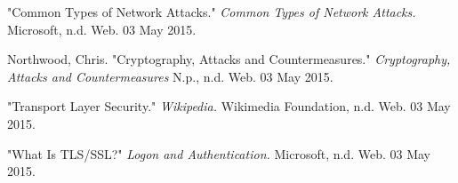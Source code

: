 \documentclass[a4paper,twoside,10pt]{report}
\begin{document}

\clearpage
{}
\begin{thebibliography}{9}
"Common Types of Network Attacks."
\textit{Common Types of Network Attacks. }
Microsoft, n.d. Web. 03 May 2015.
 
Northwood, Chris.
"Cryptography, Attacks and Countermeasures."
\textit{Cryptography, Attacks and Countermeasures}
N.p., n.d. Web. 03 May 2015.

"Transport Layer Security."
\textit{Wikipedia.} 
 Wikimedia Foundation, n.d. Web. 03 May 2015.

"What Is TLS/SSL?"
\textit{Logon and Authentication.} 
Microsoft, n.d. Web. 03 May 2015.
\end{thebibliography}

\appendix
\end{document}
